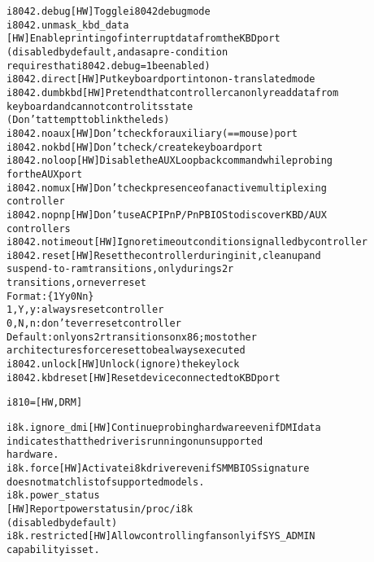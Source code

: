 \documentclass[a4paper,8pt,english]{sphinxmanual}
\begin{document}
\begin{alltt}
        i8042.debug     {[}HW{]} Toggle i8042 debug mode
        i8042.unmask\_kbd\_data
                        {[}HW{]} Enable printing of interrupt data from the KBD port
                             (disabled by default, and as a pre-condition
                             requires that i8042.debug=1 be enabled)
        i8042.direct    {[}HW{]} Put keyboard port into non-translated mode
        i8042.dumbkbd   {[}HW{]} Pretend that controller can only read data from
                             keyboard and cannot control its state
                             (Don't attempt to blink the leds)
        i8042.noaux     {[}HW{]} Don't check for auxiliary (== mouse) port
        i8042.nokbd     {[}HW{]} Don't check/create keyboard port
        i8042.noloop    {[}HW{]} Disable the AUX Loopback command while probing
                             for the AUX port
        i8042.nomux     {[}HW{]} Don't check presence of an active multiplexing
                             controller
        i8042.nopnp     {[}HW{]} Don't use ACPIPnP / PnPBIOS to discover KBD/AUX
                             controllers
        i8042.notimeout {[}HW{]} Ignore timeout condition signalled by controller
        i8042.reset     {[}HW{]} Reset the controller during init, cleanup and
                             suspend-to-ram transitions, only during s2r
                             transitions, or never reset
                        Format: \{ 1 \textbar{} Y \textbar{} y \textbar{} 0 \textbar{} N \textbar{} n \}
                        1, Y, y: always reset controller
                        0, N, n: don't ever reset controller
                        Default: only on s2r transitions on x86; most other
                        architectures force reset to be always executed
        i8042.unlock    {[}HW{]} Unlock (ignore) the keylock
        i8042.kbdreset  {[}HW{]} Reset device connected to KBD port

        i810=           {[}HW,DRM{]}

        i8k.ignore\_dmi  {[}HW{]} Continue probing hardware even if DMI data
                        indicates that the driver is running on unsupported
                        hardware.
        i8k.force       {[}HW{]} Activate i8k driver even if SMM BIOS signature
                        does not match list of supported models.
        i8k.power\_status
                        {[}HW{]} Report power status in /proc/i8k
                        (disabled by default)
        i8k.restricted  {[}HW{]} Allow controlling fans only if SYS\_ADMIN
                        capability is set.


\end{alltt}
\end{document}
